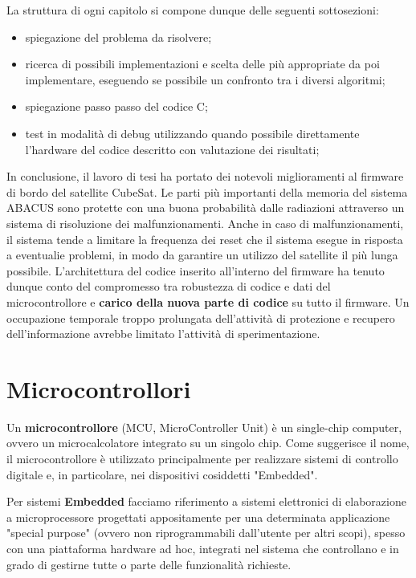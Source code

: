 \documentclass[LaM,binding=0.6cm,oneside]{../sapthesis}
\begin{document}
La struttura di ogni capitolo si compone dunque delle seguenti sottosezioni:
\begin{itemize}
    \item spiegazione del problema da risolvere;
    \item ricerca di possibili implementazioni e scelta delle più appropriate da poi implementare, eseguendo se possibile un confronto tra i diversi algoritmi;
    \item spiegazione passo passo del codice C;
    \item test in modalità di debug utilizzando quando possibile direttamente l'hardware del codice descritto con valutazione dei risultati;
    \end{itemize}
    
In conclusione, il lavoro di tesi ha portato dei notevoli miglioramenti al firmware di bordo del satellite CubeSat. Le parti più importanti della memoria del sistema ABACUS sono protette con una buona probabilità dalle radiazioni attraverso un sistema di risoluzione dei malfunzionamenti. Anche in caso di malfunzionamenti, il sistema tende a limitare la frequenza dei reset che il sistema esegue in risposta a eventualie problemi, in modo da garantire un utilizzo del satellite il più lunga possibile. 
L'architettura del codice inserito all'interno del firmware ha tenuto dunque conto del compromesso tra robustezza di codice e dati del microcontrollore e \textbf{carico della nuova parte di codice } su tutto il firmware. Un occupazione temporale troppo prolungata dell'attività di protezione e recupero dell'informazione avrebbe limitato l'attività di sperimentazione.



\mainmatter

\chapter{Microcontrollori}

Un \textbf{microcontrollore} (MCU, MicroController Unit) è un single-chip computer, ovvero un microcalcolatore integrato su un singolo chip. Come suggerisce il nome, il microcontrollore è utilizzato principalmente per realizzare sistemi di controllo digitale e, in particolare, nei dispositivi cosiddetti "Embedded".

Per sistemi \textbf{Embedded} facciamo riferimento a sistemi elettronici di elaborazione a microprocessore progettati appositamente per una determinata applicazione "special purpose" (ovvero non riprogrammabili dall'utente per altri scopi), spesso con una piattaforma hardware ad hoc, integrati nel sistema che controllano e in grado di gestirne tutte o parte delle funzionalità richieste.
\end{document}
